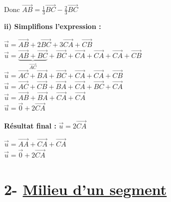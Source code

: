 \documentclass{article}
\begin{document}
\vspace{1em}

\noindent Donc $\overrightarrow{AB} = \frac{1}{3} \overrightarrow{BC} - \frac{2}{3} \overrightarrow{BC}$

\vspace{1em}

\begin{center}
\end{center}

\vspace{2em}

\noindent \textbf{ii) Simplifions l'expression :}

\vspace{1em}

\noindent $\vec{u} = \overrightarrow{AB} + 2\overrightarrow{BC} + 3\overrightarrow{CA} + \overrightarrow{CB}$ \\
$\vec{u} = \underbrace{\overrightarrow{AB} + \overrightarrow{BC}}_{\overrightarrow{AC}} + \overrightarrow{BC} + \overrightarrow{CA} + \overrightarrow{CA} + \overrightarrow{CA} + \overrightarrow{CB}$ \\
$\vec{u} = \overrightarrow{AC} + \overrightarrow{BA} + \overrightarrow{BC} + \overrightarrow{CA} + \overrightarrow{CA} + \overrightarrow{CB}$ \\
$\vec{u} = \overrightarrow{AC} + \overrightarrow{CB} + \overrightarrow{BA} + \overrightarrow{CA} + \overrightarrow{BC} + \overrightarrow{CA}$ \\
$\vec{u} = \overrightarrow{AB} + \overrightarrow{BA} + \overrightarrow{CA} + \overrightarrow{CA}$ \\
$\vec{u} = \vec{0} + 2\overrightarrow{CA}$

\vspace{1em}

\noindent \textbf{Résultat final :} $\vec{u} = 2\overrightarrow{CA}$

\noindent $\vec{u} = \overrightarrow{AA} + \overrightarrow{CA} + \overrightarrow{CA}$ \\
$\vec{u} = \vec{0} + 2\overrightarrow{CA}$

\vspace{1em}

\begin{center}
\end{center}

\section*{2- \underline{Milieu d'un segment}}
\end{document}
